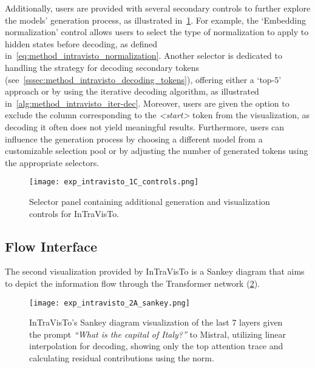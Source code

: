 Additionally, users are provided with several secondary controls to further explore the models' generation process, as illustrated in~\cref{fig:exp_intravisto_1_C}.
For example, the `Embedding normalization' control allows users to select the type of normalization to apply to hidden states before decoding, as defined in~\cref{eq:method_intravisto_normalization}.
Another selector is dedicated to handling the strategy for decoding secondary tokens (see~\cref{sssec:method_intravisto_decoding_tokens}), offering either a `top-$5$' approach or by using the iterative decoding algorithm, as illustrated in~\cref{alg:method_intravisto_iter-dec}.
Moreover, users are given the option to exclude the column corresponding to the \emph{<start>} token from the visualization, as decoding it often does not yield meaningful results.
Furthermore, users can influence the generation process by choosing a different model from a customizable selection pool or by adjusting the number of generated tokens using the appropriate selectors.

\begin{figure}[t!]
    \centering
    \texttt{[image: exp\_intravisto\_1C\_controls.png]}
    \caption{Selector panel containing additional generation and visualization controls for InTraVisTo.}
    \label{fig:exp_intravisto_1_C}
\end{figure}

\subsection{Flow Interface}\label{ssec:exp_intravisto_exp2}

The second visualization provided by InTraVisTo is a Sankey diagram that aims to depict the information flow through the Transformer network (\cref{fig:exp_intravisto_2_A}).

\begin{figure}[t!]
    \centering
    \texttt{[image: exp\_intravisto\_2A\_sankey.png]}
    \caption[InTraVisTo's Sankey diagram visualization given the prompt \emph{``What is the capital of Italy?''} to Mistral.]{InTraVisTo's Sankey diagram visualization of the last 7 layers given the prompt \emph{``What is the capital of Italy?''} to Mistral, utilizing linear interpolation for decoding, showing only the top attention trace and calculating residual contributions using the norm.}
    \label{fig:exp_intravisto_2_A}
\end{figure}

